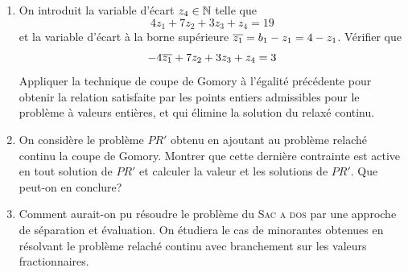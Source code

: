 \begin{td-exo}
\begin{enumerate}
		\begin{enumerate}
			\item Effectuer la mise à jour des quantités disponibles.

			\item Expliciter la solution du relaché continu (avec les nouvelles bornes).

			\item Calculer la valeur associée.
		\end{enumerate}

		\item On introduit la variable d'écart \(z_4 \in\mathbb{N}\) telle que 
		\begin{equation*}
			4z_1 + 7z_2 + 3z_3 + z_4 = 19
		\end{equation*}
		et la variable d'écart à la borne supérieure \(\overline{z_1} = b_1 - z_1 = 4 - z_1\).
		Vérifier que 
		\begin{equation*}
			-4 \overline{z_1} + 7 z_2 + 3 z_3 + z_4 = 3
		\end{equation*}
		Appliquer la technique de coupe de Gomory à l'égalité précédente pour obtenir la relation satisfaite par les points entiers admissibles pour le problème à valeurs entières, et qui élimine la solution du relaxé continu.

		\item On considère le problème \(PR'\) obtenu en ajoutant au problème relaché continu la coupe de Gomory.
		Montrer que cette dernière contrainte est active en tout solution de \(PR'\) et calculer la valeur et les solutions de \(PR'\).
		Que peut-on en conclure?

		\item Comment aurait-on pu résoudre le problème du \textsc{Sac a dos} par une approche de séparation et évaluation.
		On étudiera le cas de minorantes obtenues en résolvant le problème relaché continu avec branchement sur les valeurs fractionnaires.
	\end{enumerate}
\end{td-exo}


